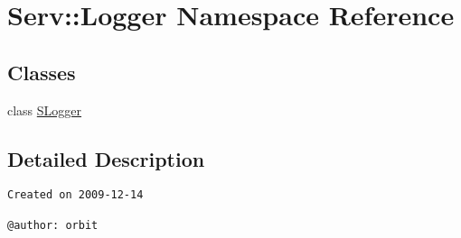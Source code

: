\hypertarget{namespace_serv_1_1_logger}{
\section{Serv::Logger Namespace Reference}
\label{namespace_serv_1_1_logger}
}
\subsection*{Classes}
\begin{CompactItemize}
\item 
class \hyperlink{class_serv_1_1_logger_1_1_s_logger}{SLogger}
\end{CompactItemize}


\subsection{Detailed Description}


\footnotesize\begin{verbatim}
Created on 2009-12-14

@author: orbit
\end{verbatim}
\normalsize
 

